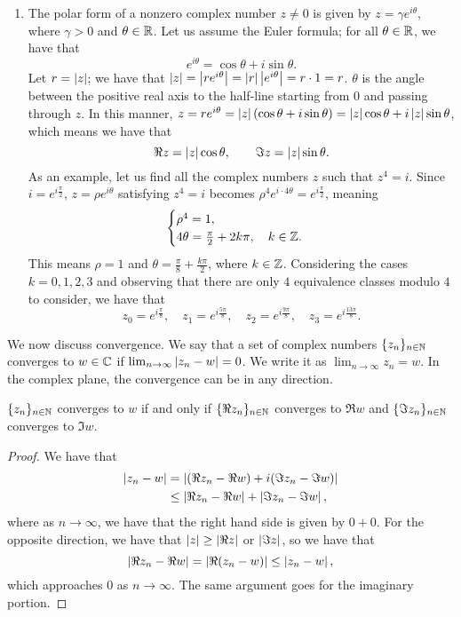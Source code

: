 \begin{enumerate}[label=(\alph*)]
    \item The polar form of a nonzero complex number $z \neq 0$ is given by $z = \gamma e^{i \theta}$, where $\gamma > 0$ and $\theta \in \mathbb R$. Let us assume the Euler formula; for all $\theta \in \mathbb R$, we have that
    \[ e^{i \theta} = \cos \theta + i \sin \theta. \]
    Let $r = \left\lvert z \right\rvert$; we have that $\left\lvert z \right\rvert = \left\lvert r e^{i \theta} \right\rvert = \left\lvert r \right\rvert \left\lvert e^{i \theta} \right\rvert = r \cdot 1 = r$. $\theta$ is the angle between the positive real axis to the half-line starting from $0$ and passing through $z$. In this manner, $z = r e^{i \theta} = \left\lvert z \right\rvert (\cos \theta + i \sin \theta) =  \left\lvert z \right\rvert \cos \theta + i \left\lvert z \right\rvert \sin \theta$, which means we have that
    \[ \Re z = \left\lvert z \right\rvert \cos \theta, \qquad \Im z = \left\lvert z \right\rvert \sin \theta. \]
    As an example, let us find all the complex numbers $z$ such that $z^4 = i$. Since $i = e^{i \frac{\pi}{2}}$, $z = \rho e^{i \theta}$ satisfying $z^4 = i$ becomes $\rho^4 e^{i \cdot 4 \theta} = e^{i \frac{\pi}{2}}$, meaning
    \[ \begin{cases} \rho^4 = 1, \\ 4 \theta = \frac{\pi}{2} + 2k \pi, \quad k \in \mathbb Z. \end{cases} \]
    This means $\rho = 1$ and $\theta = \frac{\pi}{8} + \frac{k\pi}{2}$, where $k \in \mathbb Z$. Considering the cases $k = 0, 1, 2, 3$ and observing that there are only $4$ equivalence classes modulo $4$ to consider, we have that
    \[ z_0 = e^{i \frac{\pi}{8}}, \quad z_1 = e^{i \frac{5 \pi}{8}}, \quad z_2 = e^{i \frac{9 \pi}{8}}, \quad z_3 = e^{i \frac{13 \pi}{8}}. \]
\end{enumerate}
We now discuss convergence. We say that a set of complex numbers $\{z_n\}_{n \in \mathbb N}$ converges to $w \in  \mathbb C$ if $\lim_{n \to \infty} \left\lvert z_n - w \right\rvert = 0$. We write it as $\lim_{n \to \infty} z_n = w$. In the complex plane, the convergence can be in any direction.
\begin{lemma}
    $\{z_n\}_{n \in \mathbb N}$ converges to $w$ if and only if $\{\Re z_n\}_{n \in \mathbb N}$ converges to $\Re w$ and $\{\Im z_n\}_{n \in \mathbb N}$ converges to $\Im w$.
\end{lemma}
\begin{proof}
    We have that
    \begin{align*}
        \left\lvert z_n - w \right\rvert &= \left\lvert (\Re z_n - \Re w) + i (\Im z_n - \Im w) \right\rvert \\
        &\leq \left\lvert \Re z_n - \Re w \right\rvert + \left\lvert \Im z_n - \Im w \right\rvert,
    \end{align*}
    where as $n \to \infty$, we have that the right hand side is given by $0 + 0$. For the opposite direction, we have that $\left\lvert z \right\rvert \geq \left\lvert \Re z \right\rvert$ or $\left\lvert \Im z \right\rvert$, so we have that
    \[ \left\lvert \Re z_n - \Re w \right\rvert = \left\lvert \Re (z_n - w) \right\rvert \leq \left\lvert z_n - w \right\rvert, \]
    which approaches $0$ as $n \to \infty$. The same argument goes for the imaginary portion.
\end{proof}
